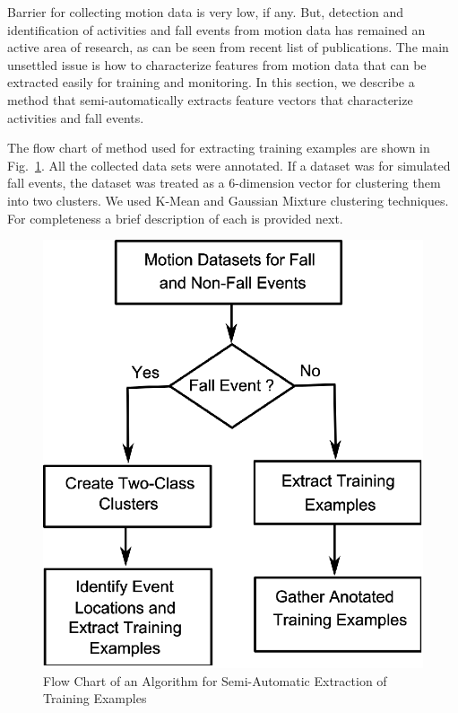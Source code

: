 \documentclass{IEEEtran}
\begin{document}
Barrier for collecting motion data is very low, if any. But, detection and identification of activities and fall events from motion data has remained an active area of research, as can be seen from recent list of publications. The main unsettled issue is how to characterize features from motion data that can be extracted easily for training and monitoring. In this section, we describe a method that semi-automatically extracts feature vectors that characterize activities and fall events.

The flow chart of method used for extracting training examples are shown in Fig.~\ref{fig:FlowChartforAlgorTrainingExamples}. All the collected data sets were annotated. If a dataset was for simulated fall events, the dataset was treated as a 6-dimension vector for clustering them into two clusters. We used K-Mean and Gaussian Mixture clustering techniques. For completeness a brief description of each is provided next.

\begin{figure}[htb]
	\centering
		\includegraphics[width = 
		0.84\columnwidth]{figures/FlowChartAlgoForTrainingExamples.eps}
	\caption{Flow Chart of an Algorithm for Semi-Automatic Extraction of Training Examples}
	\label{fig:FlowChartforAlgorTrainingExamples}
\end{figure}
\end{document}
